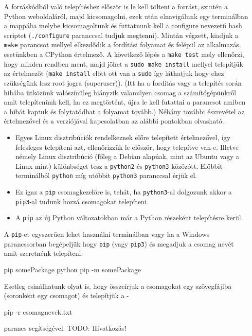 A forráskódból való telepítéshez először is le kell tölteni a forrást,
szintén a Python weboldaláról, majd kicsomagolni, ezek után elnavigálunk
egy terminálban a mappába melybe kicsomagoltunk és futtatnunk kell a
configure nevezetű bash scriptet (\texttt{./configure} paranccsal tudjuk
megtenni). Miután végzett, kiadjuk a \texttt{make} parancsot mellyel
elkezdődik a fordítási folyamat és felépül az alkalmazás, esetünkben a
CPython értelmező. A következő lépés a \texttt{make test} mely
ellenőrzi, hogy minden rendben ment, majd jöhet a \texttt{sudo make
install} mellyel telepítjük az értelmezőt (\texttt{make install} előtt ott van a
\texttt{sudo} így láthatjuk hogy ehez szükségünk lesz root jogra (superuser)).
(Itt ha a fordítás vagy a telepítés során
hibába ütközünk valószínüleg hiányzik valamilyen csomag a
számítógépünkről amit telepítenünk kell, ha ez megtörtént, újra le kell
futattni a parancsot amiben a hibát kaptuk és folytatódhat a folyamat
tovább.)
Néhány további észrevétel az értelmezővel és a verziójával kapcsolatban az alábbi pontokban olvasható.
\begin{itemize}
\item
  Egyes Linux disztribúciók rendelkeznek előre telepített
  értelmezővel, így felesleges telepíteni azt, ellenőrizzük le először,
  hogy telepítve van-e. Illetve némely Linux disztribúció (főleg a
  Debian alapúak, mint az Ubuntu vagy a Linux mint) különbséget tesz a
  \texttt{python2} és \texttt{python3} közözótt. Előbbit terminálból \texttt{python} míg
  utóbbit \texttt{python3} paranccsal érjük el.
\item Ez igaz a \texttt{pip}
  csomagkezelőre is, tehát, ha \texttt{python3}-al dolgozunk akkor a
  \texttt{pip3}-al tudunk hozzá csomagokat telepíteni.
\item
A \texttt{pip} az új Python változatokban már a Python részeként
telepítésre kerül.
\end{itemize}


A \texttt{pip}-et egyszerűen lehet használni terminálban vagy ha a Windows
parancssorban begépeljük hogy \texttt{pip} (vagy \texttt{pip3}) és megadjuk a csomag nevét
amit szeretnénk telepíteni:
\begin{python}
pip somePackage
python pip -m somePackage
\end{python}
Esetleg csinálhatunk olyat is, hogy összeírjuk a csomagokat egy
szövegfájlba (soronként egy csomagot) és telepítjük a - 
\begin{python}
pip -r csomagnevek.txt
\end{python}
parancs segítségével.
TODO: Hivatkozás! %

